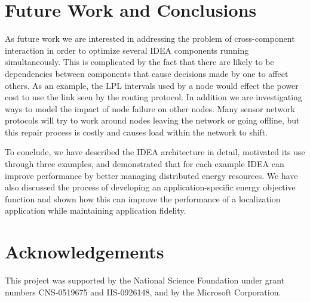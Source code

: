 \section{Future Work and Conclusions}
\label{sec-futurework}

As future work we are interested in addressing the problem of cross-component
interaction in order to optimize several IDEA components running
simultaneously. This is complicated by the fact that there are likely to be
dependencies between components that cause decisions made by one to affect
others. As an example, the LPL intervals used by a node would effect the
power cost to use the link seen by the routing protocol. In addition we are
investigating ways to model the impact of node failure on other nodes. Many
sensor network protocols will try to work around nodes leaving the network or
going offline, but this repair process is costly and causes load within the
network to shift.

To conclude, we have described the IDEA architecture in detail, motivated its
use through three examples, and demonstrated that for each example IDEA can
improve performance by better managing distributed energy resources. We have
also discussed the process of developing an application-specific energy
objective function and shown how this can improve the performance of a
localization application while maintaining application fidelity. 

\section{Acknowledgements}

This project was supported by the National Science Foundation under grant
numbers CNS-0519675 and IIS-0926148, and by the Microsoft Corporation.
